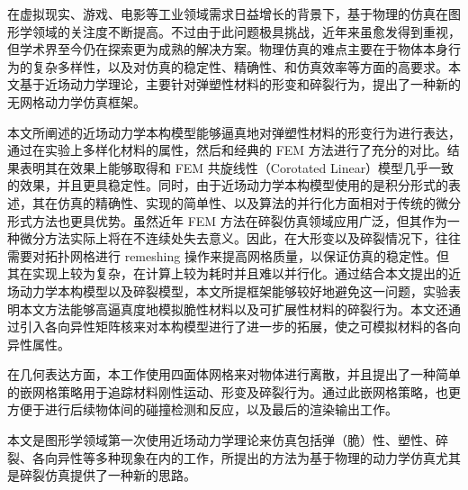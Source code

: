\begin{cabstract}
在虚拟现实、游戏、电影等工业领域需求日益增长的背景下，基于物理的仿真在图形学领域的关注度不断提高。不过由于此问题极具挑战，近年来虽愈发得到重视，但学术界至今仍在探索更为成熟的解决方案。物理仿真的难点主要在于物体本身行为的复杂多样性，以及对仿真的稳定性、精确性、和仿真效率等方面的高要求。本文基于近场动力学理论，主要针对弹塑性材料的形变和碎裂行为，提出了一种新的无网格动力学仿真框架。

本文所阐述的近场动力学本构模型能够逼真地对弹塑性材料的形变行为进行表达，通过在实验上多样化材料的属性，然后和经典的 FEM 方法进行了充分的对比。结果表明其在效果上能够取得和 FEM 共旋线性（Corotated Linear）模型几乎一致的效果，并且更具稳定性。同时，由于近场动力学本构模型使用的是积分形式的表述，其在仿真的精确性、实现的简单性、以及算法的并行化方面相对于传统的微分形式方法也更具优势。虽然近年 FEM 方法在碎裂仿真领域应用广泛，但其作为一种微分方法实际上将在不连续处失去意义。因此，在大形变以及碎裂情况下，往往需要对拓扑网格进行 remeshing 操作来提高网格质量，以保证仿真的稳定性。但其在实现上较为复杂，在计算上较为耗时并且难以并行化。通过结合本文提出的近场动力学本构模型以及碎裂模型，本文所提框架能够较好地避免这一问题，实验表明本文方法能够高逼真度地模拟脆性材料以及可扩展性材料的碎裂行为。本文还通过引入各向异性矩阵核来对本构模型进行了进一步的拓展，使之可模拟材料的各向异性属性。

在几何表达方面，本工作使用四面体网格来对物体进行离散，并且提出了一种简单的嵌网格策略用于追踪材料刚性运动、形变及碎裂行为。通过此嵌网格策略，也更方便于进行后续物体间的碰撞检测和反应，以及最后的渲染输出工作。

本文是图形学领域第一次使用近场动力学理论来仿真包括弹（脆）性、塑性、碎裂、各向异性等多种现象在内的工作，所提出的方法为基于物理的动力学仿真尤其是碎裂仿真提供了一种新的思路。

\end{cabstract}

